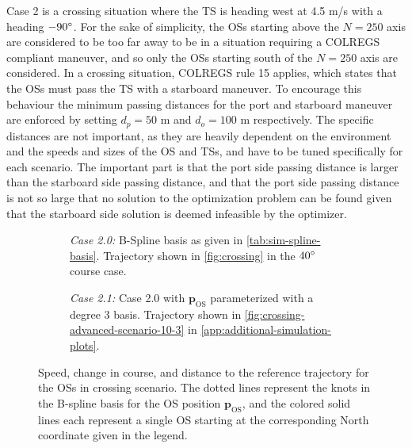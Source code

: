 Case 2 is a crossing situation where the TS is heading west at 4.5 m/s with a heading $-90\degree$. For the sake of simplicity, the OSs starting above the $N=250$ axis are considered to be too far away to be in a situation requiring a COLREGS compliant maneuver, and so only the OSs starting south of the $N=250$ axis are considered. In a crossing situation, COLREGS rule 15 applies, which states that the OSs must pass the TS with a starboard maneuver. To encourage this behaviour the minimum passing distances for the port and starboard maneuver are enforced by setting $d_p=50$ m and $d_o=100$ m respectively. The specific distances are not important, as they are heavily dependent on the environment and the speeds and sizes of the OS and TSs, and have to be tuned specifically for each scenario. The important part is that the port side passing distance is larger than the starboard side passing distance, and that the port side passing distance is not so large that no solution to the optimization problem can be found given that the starboard side solution is deemed infeasible by the optimizer.


\begin{figure}
    \centering
    \begin{subfigure}[b]{\textwidth}
        
        \caption{\emph{Case 2.0:} B-Spline basis as given in \cref{tab:sim-spline-basis}. Trajectory shown in \cref{fig:crossing} in the $40\degree$ course case.}
        \label{fig:crossing-metrics}
    \end{subfigure}
    \begin{subfigure}[b]{\textwidth}
        
        \caption{\emph{Case 2.1:}  Case 2.0 with $\mathbf p_\text{OS}$ parameterized with a degree 3 basis. Trajectory shown in \cref{fig:crossing-advanced-scenario-10-3} in \cref{app:additional-simulation-plots}.}
        \label{fig:crossing-scenario-degree-3-metrics}
    \end{subfigure}
    \caption{Speed, change in course, and distance to the reference trajectory for the OSs in crossing scenario. The dotted lines represent the knots in the B-spline basis for the OS position $\mathbf p_\text{OS}$, and the colored solid lines each represent a single OS starting at the corresponding North coordinate given in the legend.}
    \label{fig:crossing-scenario-metrics}
\end{figure}


